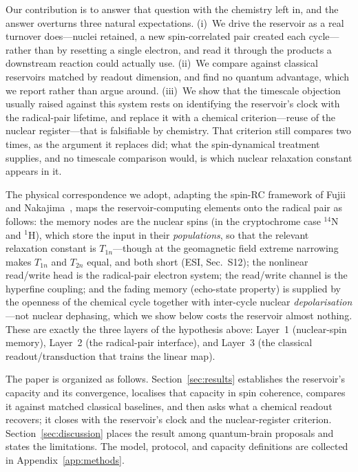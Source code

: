 \documentclass[aps,prx,reprint,superscriptaddress,nofootinbib,floatfix]{revtex4-2}
\begin{document}
Our contribution is to answer that question with the chemistry left in, and the
answer overturns three natural expectations. (i)~We drive the reservoir as a real
turnover does---nuclei retained, a new spin-correlated pair created each
cycle---rather than by resetting a single electron, and read it through the products
a downstream reaction could actually use. (ii)~We compare against classical
reservoirs matched by readout dimension, and find no quantum advantage, which we
report rather than argue around. (iii)~We show that the timescale objection usually
raised against this system rests on identifying the reservoir's clock with the
radical-pair lifetime, and replace it with a chemical criterion---reuse of the
nuclear register---that is falsifiable by chemistry. That criterion still compares
two times, as the argument it replaces did; what the spin-dynamical treatment
supplies, and no timescale comparison would, is which nuclear relaxation constant
appears in it.

The physical correspondence we adopt, adapting the spin-RC framework of Fujii and
Nakajima~\cite{Fujii2017}, maps the reservoir-computing elements onto the radical
pair as follows: the memory nodes are the nuclear spins (in the
cryptochrome case $^{14}$N and $^1$H), which store the input in their
\emph{populations}, so that the relevant relaxation constant is $T_{1n}$---though
at the geomagnetic field extreme narrowing makes $T_{1n}$ and $T_{2n}$ equal, and
both short (ESI, Sec.~S12); the nonlinear read/write head is the radical-pair electron system;
the read/write channel is the hyperfine coupling; and the fading memory
(echo-state property) is supplied by the openness of the chemical cycle together
with inter-cycle nuclear \emph{depolarisation}---not nuclear dephasing, which we
show below costs the reservoir almost nothing. These are exactly the three layers of the hypothesis above: Layer~1
(nuclear-spin memory), Layer~2 (the radical-pair interface), and Layer~3 (the
classical readout/transduction that trains the linear map).

The paper is organized as follows. Section~\ref{sec:results} establishes the
reservoir's capacity and its convergence, localises that capacity in spin coherence,
compares it against matched classical baselines, and then asks what a chemical
readout recovers; it closes with the reservoir's clock and the nuclear-register
criterion. Section~\ref{sec:discussion} places the result among quantum-brain
proposals and states the limitations. The model, protocol, and capacity definitions
are collected in Appendix~\ref{app:methods}.
\end{document}
